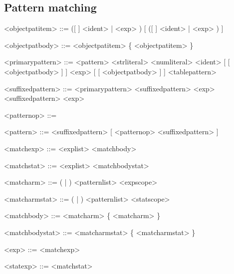 \documentclass{article}
\newenvironment{bnf}
{
\begin{mdframed}
\begin{grammar}
}
{
\end{grammar}
\end{mdframed}
}
\begin{document}
\subsection{Pattern matching}
\begin{bnf}
<objectpatitem> ::= ([ \lit{\$} ] <ident> | \lit{\$(} <exp> \lit{)})
    [ \lit{:} ([ \lit{\$} ] <ident> | \lit{\$(} <exp> \lit{)}) ]

<objectpatbody> ::= <objectpatitem> \{ \lit{,} <objectpatitem> \}

<primarypattern> ::= \lit{(} <pattern> \lit{)}
    \alt <strliteral>
    \alt <numliteral>
    \alt {}
    \alt {}
    \alt {}
    \alt [ \lit{\$} ] <ident> [ \lit{(} [ <objectpatbody> ] \lit{)} ]
    \alt \lit{\$(} <exp> \lit{)} [ \lit{(} [ <objectpatbody> ] \lit{)} ]
    \alt <tablepattern>

<suffixedpattern> ::= <primarypattern>
    \alt <suffixedpattern>  <exp>
    \alt <suffixedpattern>  <exp>

<patternop> ::= 
    \alt {}
    \alt \lit{::}

<pattern> ::= <suffixedpattern> [ <patternop> <suffixedpattern> ]

<matchexp> ::=  <explist> \lit{->} <matchbody>

<matchstat> ::=  <explist> \lit{->} <matchbodystat>

<matcharm> ::= (\lit{|} | ) <patternlist> <expscope>

<matcharmstat> ::= (\lit{|} | ) <patternlist> <statscope>

<matchbody> ::= <matcharm> \{ <matcharm> \}

<matchbodystat> ::= <matcharmstat> \{ <matcharmstat> \}

<exp> ::= <matchexp>

<statexp> ::= <matchstat>
\end{bnf}
\end{document}
